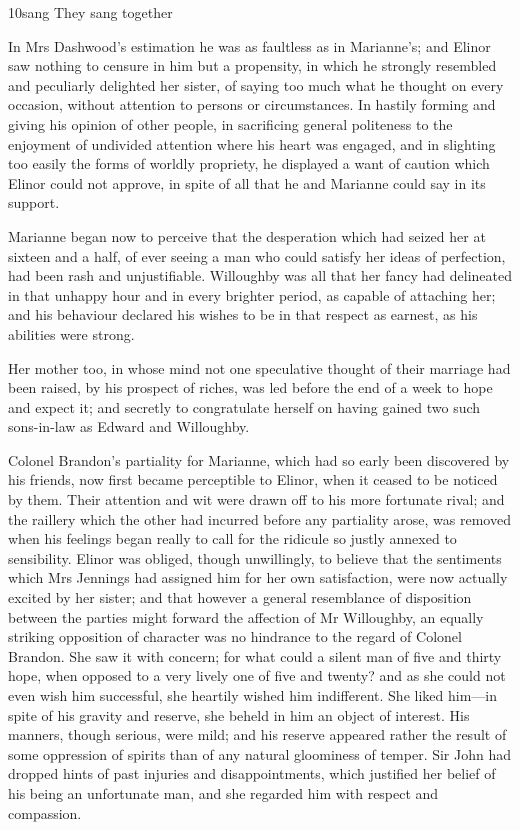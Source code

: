 
\begin{bwbigpic}
	[1.0]
	{10sang} 
	{They sang together} 
\end{bwbigpic}

In Mrs Dashwood's estimation he was as faultless as in Marianne's; and Elinor saw nothing to censure in him but a propensity, in which he strongly resembled and peculiarly delighted her sister, of saying too much what he thought on every occasion, without attention to persons or circumstances. In hastily forming and giving his opinion of other people, in sacrificing general politeness to the enjoyment of undivided attention where his heart was engaged, and in slighting too easily the forms of worldly propriety, he displayed a want of caution which Elinor could not approve, in spite of all that he and Marianne could say in its support.

Marianne began now to perceive that the desperation which had seized her at sixteen and a half, of ever seeing a man who could satisfy her ideas of perfection, had been rash and unjustifiable. Willoughby was all that her fancy had delineated in that unhappy hour and in every brighter period, as capable of attaching her; and his behaviour declared his wishes to be in that respect as earnest, as his abilities were strong.

Her mother too, in whose mind not one speculative thought of their marriage had been raised, by his prospect of riches, was led before the end of a week to hope and expect it; and secretly to congratulate herself on having gained two such sons-in-law as Edward and Willoughby.

Colonel Brandon's partiality for Marianne, which had so early been discovered by his friends, now first became perceptible to Elinor, when it ceased to be noticed by them. Their attention and wit were drawn off to his more fortunate rival; and the raillery which the other had incurred before any partiality arose, was removed when his feelings began really to call for the ridicule so justly annexed to sensibility. Elinor was obliged, though unwillingly, to believe that the sentiments which Mrs Jennings had assigned him for her own satisfaction, were now actually excited by her sister; and that however a general resemblance of disposition between the parties might forward the affection of Mr Willoughby, an equally striking opposition of character was no hindrance to the regard of Colonel Brandon. She saw it with concern; for what could a silent man of five and thirty hope, when opposed to a very lively one of five and twenty? and as she could not even wish him successful, she heartily wished him indifferent. She liked him—in spite of his gravity and reserve, she beheld in him an object of interest. His manners, though serious, were mild; and his reserve appeared rather the result of some oppression of spirits than of any natural gloominess of temper. Sir John had dropped hints of past injuries and disappointments, which justified her belief of his being an unfortunate man, and she regarded him with respect and compassion.

